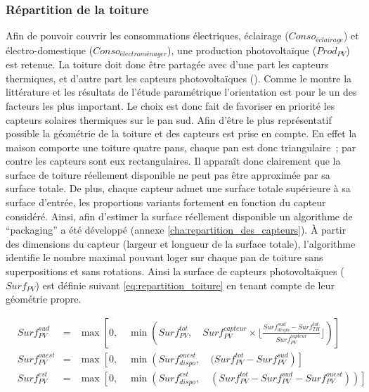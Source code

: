 \subsubsection{Répartition de la toiture} %
\label{ssub:repartition_de_la_toiture}
Afin de pouvoir couvrir les consommations électriques, éclairage ($Conso_{éclairage}$) et
électro-domestique ($Conso_{électroménager}$), une production photovoltaïque ($Prod_{PV}$)
est retenue. La toiture doit donc être partagée avec d’une part les capteurs thermiques, et
d’autre part les capteurs photovoltaïques (). Comme le montre la littérature et les résultats
de l’étude paramétrique l’orientation est pour le  un des facteurs les plus
important. Le choix est donc fait de favoriser en priorité les capteurs solaires
thermiques sur le pan sud. Afin d’être le plus représentatif possible la géométrie
de la toiture et des capteurs est prise en compte.
En effet la maison comporte une toiture quatre pans, chaque pan est donc triangulaire~; par
contre les capteurs sont eux rectangulaires. Il apparaît donc clairement que la surface
de toiture réellement disponible ne peut pas être approximée par sa surface totale.
De plus, chaque capteur admet une surface totale supérieure à sa surface d’entrée,
les proportions variants fortement en fonction du capteur considéré.
Ainsi, afin d’estimer la surface réellement disponible un algorithme de \enquote{packaging}
a été développé (annexe \ref{cha:repartition_des_capteurs}). À partir des dimensions
du capteur (largeur et longueur de la surface totale), l’algorithme identifie le
nombre maximal pouvant loger sur chaque pan de toiture sans superpositions et sans rotations.
Ainsi la surface de capteurs photovoltaïques ($Surf_{PV}$) est définie suivant
\eqref{eq:repartition_toiture} en tenant compte de leur géométrie propre.

\begin{equation}\label{eq:repartition_toiture}
  \begin{aligned}
    &Surf_{PV}^{sud}   &=& \max\left[0,\quad \min \left(Surf_{PV}^{tot},\quad Surf_{PV}^{capteur} \times
                                                      \Bigg\lfloor\frac{Surf_{dispo}^{sud} - Surf_{TH}^{tot}}{Surf_{PV}^{capteur}}\Bigg\rfloor\right)
                                   \right] \\
    &Surf_{PV}^{ouest} &=& \max \left[0,\quad \min\left(Surf_{dispo}^{ouest},\quad
                                                      (Surf_{PV}^{tot} - Surf_{PV}^{sud}\right)
                                    \right] \\
    &Surf_{PV}^{est} &=& \max \left[0,\quad \min\left(Surf_{dispo}^{est},\quad
                                                    (Surf_{PV}^{tot} - Surf_{PV}^{sud} - Surf_{PV}^{ouest}) \right) \right] \\
  \end{aligned}
\end{equation}

